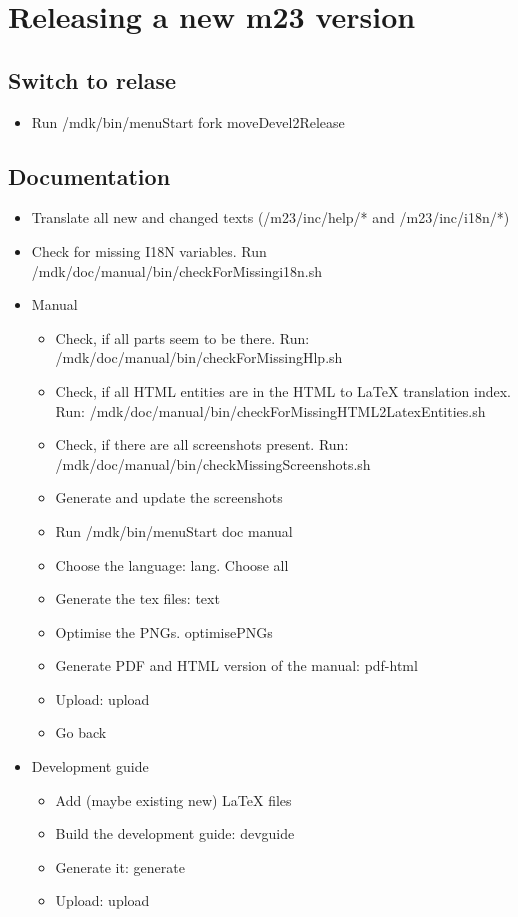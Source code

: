 \section{Releasing a new m23 version}

\subsection{Switch to relase}
\begin{itemize}
	\item Run /mdk/bin/menuStart \Rightarrow fork \Rightarrow moveDevel2Release
\end{itemize}


\subsection{Documentation}
\begin{itemize}
	\item Translate all new and changed texts (/m23/inc/help/* and /m23/inc/i18n/*)
	\item Check for missing I18N variables. Run /mdk/doc/manual/bin/checkForMissingi18n.sh
	\item Manual
	\begin{itemize}
		\item Check, if all parts seem to be there. Run: /mdk/doc/manual/bin/checkForMissingHlp.sh
		\item Check, if all HTML entities are in the HTML to LaTeX translation index. Run: /mdk/doc/manual/bin/checkForMissingHTML2LatexEntities.sh
		\item Check, if there are all screenshots present. Run: /mdk/doc/manual/bin/checkMissingScreenshots.sh
		\item Generate and update the screenshots
		\item Run /mdk/bin/menuStart \Rightarrow doc \Rightarrow manual
		\item Choose the language: \Rightarrow lang. Choose all
		\item Generate the tex files: \Rightarrow text
		\item Optimise the PNGs. \Rightarrow optimisePNGs
		\item Generate PDF and HTML version of the manual: \Rightarrow pdf-html
		\item Upload: \Rightarrow upload
		\item Go back
	\end{itemize}
	\item Development guide
	\begin{itemize}
		\item Add (maybe existing new) LaTeX files
		\item Build the development guide: \Rightarrow devguide
		\item Generate it: \Rightarrow generate
		\item Upload: \Rightarrow upload
	\end{itemize}
\end{itemize}



